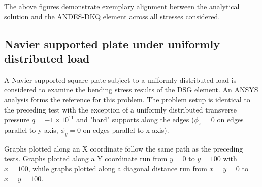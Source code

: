 The above figures demonstrate exemplary alignment between the analytical solution and the ANDES-DKQ element across all stresses considered.

\subsection{Navier supported plate under uniformly distributed load}
\label{validation:DSG navier unifom}

A Navier supported square plate subject to a uniformly distributed load is considered to examine the bending stress results of the DSG element. An ANSYS analysis forms the reference for this problem. The problem setup is identical to the preceding test with the exception of a uniformly distributed transverse pressure $q = -1\times 10^{11}$ and "hard" supports along the edges ($\phi_x = 0$ on edges parallel to y-axis, $\phi_y = 0$ on edges parallel to x-axis).

Graphs plotted along an X coordinate follow the same path as the preceding tests. Graphs plotted along a Y coordinate run from $y = 0$ to $y = 100$ with $x = 100$, while graphs plotted along a diagonal distance run from $x=y=0$ to $x=y=100$.
%
%

